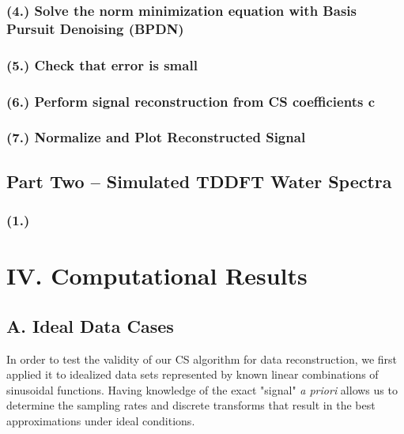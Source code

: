 \documentclass[11pt]{article}
\begin{document}
\subsubsection*{(4.)	Solve the norm minimization equation with Basis Pursuit Denoising (BPDN)}
\subsubsection*{(5.)	Check that error is small}
\subsubsection*{(6.)	Perform signal reconstruction from CS coefficients $\mathbf{c}$}
\subsubsection*{(7.)	Normalize and Plot Reconstructed Signal} 

\subsection*{Part Two -- Simulated TDDFT Water Spectra}
\subsubsection*{(1.)  }




\section*{IV.	Computational Results} %


\subsection*{A.	Ideal Data Cases}
In order to test the validity of our CS algorithm for data reconstruction, we first applied it to idealized data sets represented by known linear combinations of sinusoidal functions. Having knowledge of the exact "signal" \emph{a priori} allows us to determine the sampling rates and discrete transforms that result in the best approximations under ideal conditions. 

\end{document}
